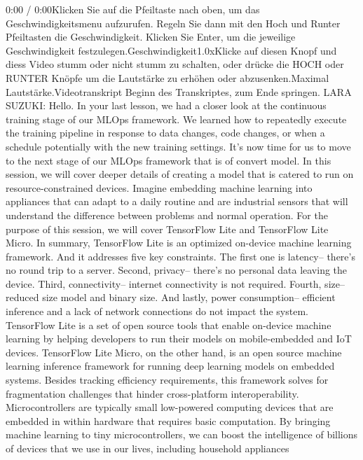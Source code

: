 {{{{{    0:00 / 0:00Klicken Sie auf die Pfeiltaste nach oben, um das Geschwindigkeitsmenu aufzurufen. Regeln Sie dann mit den Hoch und Runter Pfeiltasten die Geschwindigkeit. Klicken Sie Enter, um die jeweilige Geschwindigkeit festzulegen.Geschwindigkeit1.0xKlicke auf diesen Knopf und diess Video stumm oder nicht stumm zu schalten, oder drücke die HOCH oder RUNTER Knöpfe um die Lautstärke zu erhöhen oder abzusenken.Maximal Lautstärke.Videotranskript
    Beginn des Transkriptes, zum Ende springen.
    LARA SUZUKI: Hello.
    In your last lesson, we had a closer look at the continuous training
    stage of our MLOps framework.
    We learned how to repeatedly execute the training pipeline in response
    to data changes, code changes, or when a schedule potentially
    with the new training settings.
    It's now time for us to move to the next stage of our MLOps framework
    that is of convert model.
    In this session, we will cover deeper details
    of creating a model that is catered to run on resource-constrained devices.
    Imagine embedding machine learning into appliances
    that can adapt to a daily routine and are
    industrial sensors that will understand the difference between problems
    and normal operation.
    For the purpose of this session, we will cover TensorFlow Lite
    and TensorFlow Lite Micro.
    In summary, TensorFlow Lite is an optimized on-device machine
    learning framework.
    And it addresses five key constraints.
    The first one is latency--
    there's no round trip to a server.
    Second, privacy-- there's no personal data leaving the device.
    Third, connectivity-- internet connectivity is not required.
    Fourth, size-- reduced size model and binary size.
    And lastly, power consumption-- efficient inference
    and a lack of network connections do not impact the system.
    TensorFlow Lite is a set of open source tools
    that enable on-device machine learning by helping developers
    to run their models on mobile-embedded and IoT devices.
    TensorFlow Lite Micro, on the other hand,
    is an open source machine learning inference framework
    for running deep learning models on embedded systems.
    Besides tracking efficiency requirements,
    this framework solves for fragmentation challenges that
    hinder cross-platform interoperability.
    Microcontrollers are typically small low-powered computing devices
    that are embedded in within hardware that requires basic computation.
    By bringing machine learning to tiny microcontrollers,
    we can boost the intelligence of billions of devices
    that we use in our lives, including household appliances
}}}}}
